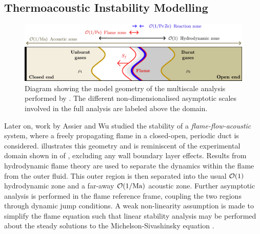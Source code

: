 \subsection{Thermoacoustic Instability Modelling}

\begin{figure}[t]
\centering
\includegraphics[scale=0.6]{assets/imgs/AW-flame.pdf}
\caption{Diagram showing the model geometry of the multiscale analysis performed by \cite{assier2014LinearWeaklyNonlinear}. The different non-dimensionalised asymptotic scales involved in the full analysis are labeled above the domain.}
\label{fig:AW-flame}
\end{figure}

Later on, work by Assier and Wu \cite{assier2014LinearWeaklyNonlinear} studied the stability of a \emph{flame-flow-acoustic} system, where a freely propagating flame in a closed-open, periodic duct is considered.  illustrates this geometry and is reminiscent of the experimental domain shown in  of \cite{searby1992AcousticInstabilityPremixed}, excluding any wall boundary layer effects. Results from hydrodynamic flame theory \cite{matalon1982FlamesGasdynamicDiscontinuities,clavin1982EffectsMolecularDiffusion} are used to separate the dynamics within the flame from the outer fluid. This outer region is then separated into the usual $\mathcal{O}(1)$ hydrodynamic zone and a far-away $\mathcal{O}(1/\mathrm{Ma})$ acoustic zone. Further asymptotic analysis is performed in the flame reference frame, coupling the two regions through dynamic jump conditions. A weak non-linearity assumption is made to simplify the flame equation such that linear stability analysis may be performed about the steady solutions to the Michelson-Sivashinsky equation \cite{sivashinsky1977NonlinearAnalysisHydrodynamic,michelson1977NonlinearAnalysisHydrodynamic,matalon2018DarrieusLandauInstability}.

